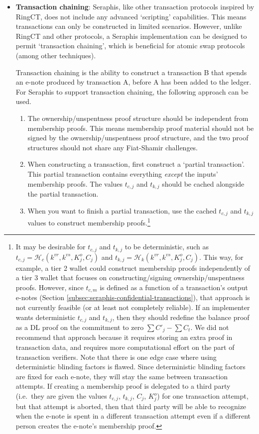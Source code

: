 \begin{itemize}
    \item \textbf{Transaction chaining}: Seraphis, like other transaction protocols inspired by RingCT, does not include any advanced `scripting' capabilities. This means transactions can only be constructed in limited scenarios. However, unlike RingCT and other protocols, a Seraphis implementation can be designed to permit `transaction chaining', which is beneficial for atomic swap protocols \cite{atomic-swaps-paper} (among other techniques).

    Transaction chaining is the ability to construct a transaction B that spends an e-note produced by transaction A, before A has been added to the ledger. For Seraphis to support transaction chaining, the following approach can be used.

    \begin{enumerate}
        \item The ownership/unspentness proof structure should be independent from membership proofs. This means membership proof material should not be signed by the ownership/unspentness proof structure, and the two proof structures should not share any Fiat-Shamir challenges.

        \item When constructing a transaction, first construct a `partial transaction'. This partial transaction contains everything {\em except} the inputs' membership proofs. The values $t_{c,j}$ and $t_{k,j}$ should be cached alongside the partial transaction.

        \item When you want to finish a partial transaction, use the cached $t_{c,j}$ and $t_{k,j}$ values to construct membership proofs.\footnote{It may be desirable for $t_{c,j}$ and $t_{k,j}$ to be deterministic, such as $t_{c,j} = \mathcal{H}_c(k^{vr}, k^{vs}, K^o_j, C_j)$ and $t_{k,j} = \mathcal{H}_k(k^{vr}, k^{vs}, K^o_j, C_j)$. This way, for example, a tier 2 wallet could construct membership proofs independently of a tier 3 wallet that focuses on constructing/signing ownership/unspentness proofs. However, since $t_{c,m}$ is defined as a function of a transaction's output e-notes (Section \ref{subsec:seraphis-confidential-transactions}), that approach is not currently feasible (or at least not completely reliable). If an implementer wants deterministic $t_{c,j}$ and $t_{k,j}$, then they should redefine the balance proof as a DL proof on the commitment to zero $\sum C'_j - \sum C_t$. We did not recommend that approach because it requires storing an extra proof in transaction data, and requires more computational effort on the part of transaction verifiers. Note that there is one edge case where using deterministic blinding factors is flawed. Since deterministic blinding factors are fixed for each e-note, they will stay the same between transaction attempts. If creating a membership proof is delegated to a third party (i.e.\ they are given the values $t_{c,j}$, $t_{k,j}$, $C_j$, $K^o_j$) for one transaction attempt, but that attempt is aborted, then that third party will be able to recognize when the e-note is spent in a different transaction attempt even if a different person creates the e-note's membership proof.}
    \end{enumerate}


\end{itemize}
